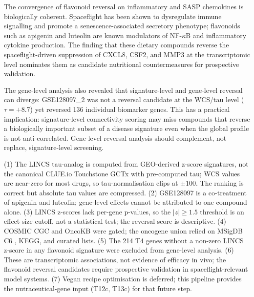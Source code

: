 \documentclass[pdflatex,sn-nature]{sn-jnl}
\begin{document}
The convergence of flavonoid reversal on inflammatory and SASP chemokines is
biologically coherent. Spaceflight has been shown to dysregulate immune signalling
and promote a senescence-associated secretory phenotype; flavonoids such as
apigenin and luteolin are known modulators of NF-\(\kappa\)B and inflammatory
cytokine production. The finding that these dietary compounds reverse the
spaceflight-driven suppression of CXCL8, CSF2, and MMP3 at the transcriptomic level
nominates them as candidate nutritional countermeasures for prospective validation.

The gene-level analysis also revealed that signature-level and gene-level reversal
can diverge: GSE128097\_2 was not a reversal candidate at the WCS/tau level (\(\tau
= +8.7\)) yet reversed 136 individual biomarker genes. This has a practical
implication: signature-level connectivity scoring may miss compounds that reverse a
biologically important subset of a disease signature even when the global profile is
not anti-correlated. Gene-level reversal analysis should complement, not replace,
signature-level screening.

(1) The LINCS tau-analog is computed from GEO-derived z-score signatures, not the
canonical CLUE.io Touchstone GCTx with pre-computed tau; WCS values are near-zero
for most drugs, so tau-normalisation clips at \(\pm 100\). The ranking is correct
but absolute tau values are compressed. (2) GSE128097 is a co-treatment of apigenin
and luteolin; gene-level effects cannot be attributed to one compound alone. (3)
LINCS z-scores lack per-gene p-values, so the \(|z| \geq 1.5\) threshold is an
effect-size cutoff, not a statistical test; the reversal score is descriptive. (4)
COSMIC CGC and OncoKB were gated; the oncogene union relied on MSigDB C6
\cite{liberzon2015}, KEGG, and curated lists. (5) The 214 T4 genes without a non-zero
LINCS z-score in any flavonoid signature were excluded from gene-level analysis. (6) These are transcriptomic associations,
not evidence of efficacy in vivo; the flavonoid reversal candidates require
prospective validation in spaceflight-relevant model systems. (7) Vegan recipe
optimisation is deferred; this pipeline provides the nutraceutical-gene input
(T12c, T13c) for that future step.
\end{document}
